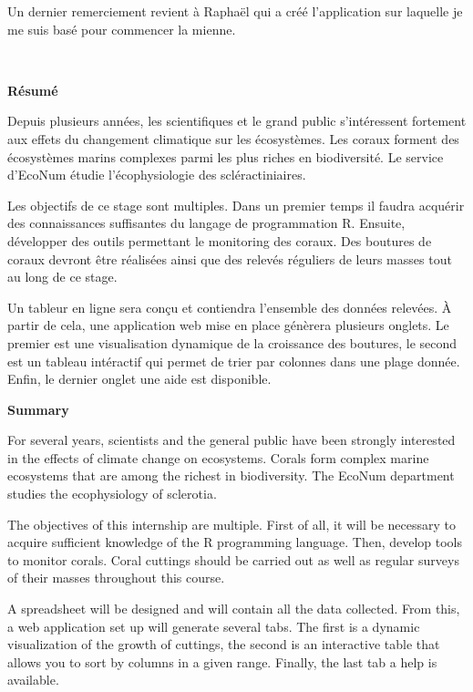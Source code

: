 \documentclass[]{report}
\begin{document}
Un dernier remerciement revient à Raphaël qui a créé l'application sur
laquelle je me suis basé pour commencer la mienne. \vfill
\null
\newpage

\textcolor{white}{.}

\Huge 
{\bf Résumé} \vspace{1 cm}

\normalsize

Depuis plusieurs années, les scientifiques et le grand public
s'intéressent fortement aux effets du changement climatique sur les
écosystèmes. Les coraux forment des écosystèmes marins complexes parmi
les plus riches en biodiversité. Le service d'EcoNum étudie
l'écophysiologie des scléractiniaires.

Les objectifs de ce stage sont multiples. Dans un premier temps il
faudra acquérir des connaissances suffisantes du langage de
programmation R. Ensuite, développer des outils permettant le monitoring
des coraux. Des boutures de coraux devront être réalisées ainsi que des
relevés réguliers de leurs masses tout au long de ce stage.

Un tableur en ligne sera conçu et contiendra l'ensemble des données
relevées. À partir de cela, une application web mise en place génèrera
plusieurs onglets. Le premier est une visualisation dynamique de la
croissance des boutures, le second est un tableau intéractif qui permet
de trier par colonnes dans une plage donnée. Enfin, le dernier onglet
une aide est disponible.

\vspace{2 cm}

\Huge 
{\bf Summary} \vspace{1 cm}

\normalsize
For several years, scientists and the general public have been strongly
interested in the effects of climate change on ecosystems. Corals form
complex marine ecosystems that are among the richest in biodiversity.
The EcoNum department studies the ecophysiology of sclerotia.

The objectives of this internship are multiple. First of all, it will be
necessary to acquire sufficient knowledge of the R programming language.
Then, develop tools to monitor corals. Coral cuttings should be carried
out as well as regular surveys of their masses throughout this course.

A spreadsheet will be designed and will contain all the data collected.
From this, a web application set up will generate several tabs. The
first is a dynamic visualization of the growth of cuttings, the second
is an interactive table that allows you to sort by columns in a given
range. Finally, the last tab a help is available.
\end{document}
